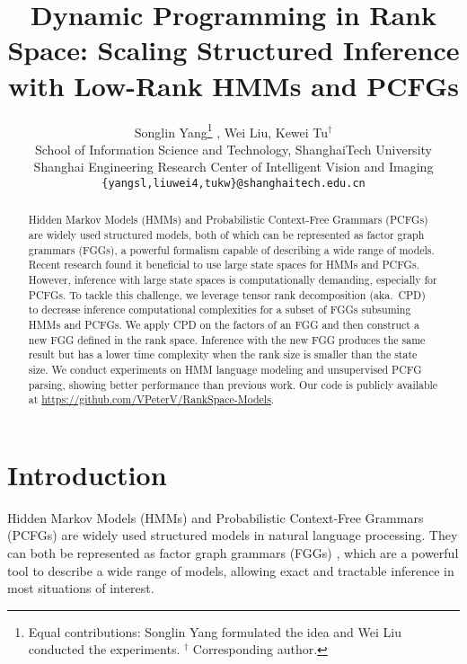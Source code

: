 \documentclass[11pt]{article}
\title{Dynamic Programming in Rank Space: Scaling Structured Inference with Low-Rank HMMs and PCFGs}
\author{Songlin Yang\thanks{\; Equal contributions: Songlin Yang formulated the idea and Wei Liu conducted the experiments.  $^\dagger$ Corresponding author.} , Wei Liu\printfnsymbol{1}, Kewei Tu$^{\dagger}$\\
  School of Information Science and Technology, ShanghaiTech University \\
    Shanghai Engineering Research Center of Intelligent Vision and Imaging\\ 
    {\tt \{yangsl,liuwei4,tukw\}@shanghaitech.edu.cn}\\
 }
\begin{document}
\maketitle
\begin{abstract}
Hidden Markov Models (HMMs) and Probabilistic Context-Free Grammars (PCFGs) are widely used structured models, both of which can be represented as factor graph grammars (FGGs), a powerful formalism capable of describing a wide range of models. Recent research found it beneficial to use large state spaces for HMMs and PCFGs. However, inference with large state spaces is computationally demanding, especially for PCFGs. To tackle this challenge, we leverage tensor rank decomposition (aka.\ CPD) to decrease inference computational complexities for a subset of FGGs subsuming HMMs and PCFGs. We apply CPD on the factors of an FGG and then construct a new FGG defined in the rank space. Inference with the new FGG produces the same result but has a lower time complexity when the rank size is smaller than the state size. We conduct experiments on HMM language modeling and unsupervised PCFG parsing, showing better performance than previous work. Our code is publicly available at \url{https://github.com/VPeterV/RankSpace-Models}.



\end{abstract}

\section{Introduction}
Hidden Markov Models (HMMs) and Probabilistic Context-Free Grammars (PCFGs) are widely used structured models in natural language processing. They can both be represented as factor graph grammars (FGGs) \cite{DBLP:conf/nips/0001R20}, which are a powerful tool to describe a wide range of models, allowing exact and tractable inference in most situations of interest.
\end{document}
